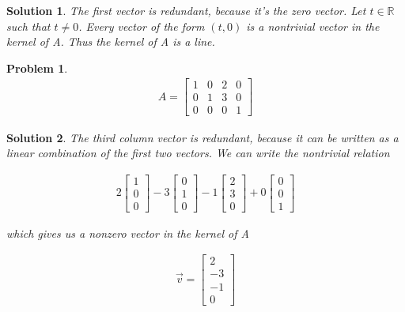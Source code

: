 \documentclass{article}
\newtheorem{problem}{Problem}
\newtheorem*{solution}{Solution}
\begin{document}
\begin{solution}
The first vector is redundant, because it's the zero vector. Let $t \in \mathbb{R}$ such that $t \neq 0$. Every vector of the form $(t, 0)$ is a nontrivial vector in the kernel of A. Thus the kernel of A is a line. 
\end{solution}

\begin{problem}
\begin{align*}
A = \begin{bmatrix}1 & 0 & 2 & 0 \\ 0 & 1 & 3 & 0 \\ 0 & 0 & 0 & 1 \end{bmatrix}
\end{align*}
\end{problem}

\begin{solution}
The third column vector is redundant, because it can be written as a linear combination of the first two vectors. We can write the nontrivial relation

\begin{align*}
2 \begin{bmatrix} 1 \\ 0 \\ 0 \end{bmatrix} - 3 \begin{bmatrix} 0 \\ 1 \\ 0 \end{bmatrix} - 1 \begin{bmatrix} 2 \\ 3 \\ 0 \end{bmatrix} + 0 \begin{bmatrix} 0 \\ 0 \\ 1 \end{bmatrix}
\end{align*}

which gives us a nonzero vector in the kernel of A 

\begin{align*}
\vec{v} = \begin{bmatrix} 2 \\ -3 \\ -1 \\ 0 \end{bmatrix}
\end{align*}
\end{solution}
\end{document}
